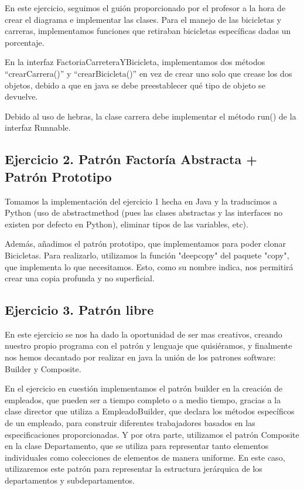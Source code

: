 \documentclass[
]{article}
\begin{document}
En este ejercicio, seguimos el guión proporcionado por el profesor a la
hora de crear el diagrama e implementar las clases. Para el manejo de
las bicicletas y carreras, implementamos funciones que retiraban
bicicletas específicas dadas un porcentaje.

En la interfaz FactoriaCarreteraYBicicleta, implementamos dos métodos
``crearCarrera()'' y ``crearBicicleta()'' en vez de crear uno solo que
crease los dos objetos, debido a que en java se debe preestablecer qué
tipo de objeto se devuelve.

Debido al uso de hebras, la clase carrera debe implementar el método
run() de la interfaz Runnable.

\subsection{\texorpdfstring{\textbf{Ejercicio 2. Patrón Factoría
Abstracta + Patrón
Prototipo}}{Ejercicio 2. Patrón Factoría Abstracta + Patrón Prototipo}}\label{ejercicio-2.-patruxf3n-factoruxeda-abstracta-patruxf3n-prototipo}

Tomamos la implementación del ejercicio 1 hecha en Java y la traducimos
a Python (uso de abstractmethod (pues las clases abstractas y las
interfaces no existen por defecto en Python), eliminar tipos de las
variables, etc).

Además, añadimos el patrón prototipo, que implementamos para poder
clonar Bicicletas. Para realizarlo, utilizamos la función "deepcopy" del
paquete "copy", que implementa lo que necesitamos. Esto, como su nombre
indica, nos permitirá crear una copia profunda y no superficial.

\subsection{\texorpdfstring{\textbf{Ejercicio 3}. \textbf{Patrón
libre}}{Ejercicio 3. Patrón libre}}\label{ejercicio-3.-patruxf3n-libre}

En este ejercicio se nos ha dado la oportunidad de ser mas creativos, creando nuestro propio programa con el patrón y lenguaje que quisiéramos, y finalmente nos hemos decantado por realizar en java la unión de los patrones software: Builder y Composite. 

En el ejercicio en cuestión implementamos el patrón builder en la creación de empleados, que pueden ser  a tiempo completo o a medio tiempo, gracias a la clase director que utiliza a EmpleadoBuilder, que declara los métodos específicos de un empleado, para construir diferentes trabajadores basados en las especificaciones proporcionadas. Y por otra parte, utilizamos el patrón Composite en la clase Departamento, que se utiliza para representar tanto elementos individuales como colecciones de elementos de manera uniforme. En este caso, utilizaremos este patrón para representar la estructura jerárquica de los departamentos y subdepartamentos.
\end{document}
